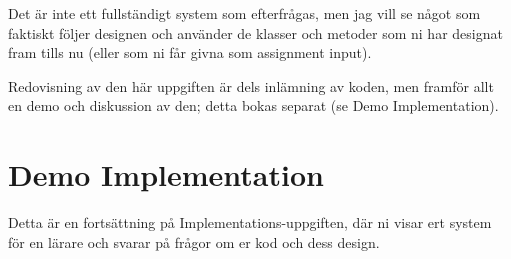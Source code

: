 \documentclass[8pt,oneside]{memoir}
\begin{document}
Det är inte ett fullständigt system som efterfrågas, men jag vill se något som faktiskt följer designen och använder de klasser och metoder som ni har designat fram tills nu (eller som ni får givna som assignment input).

Redovisning av den här uppgiften är dels inlämning av koden, men framför allt en demo och diskussion av den; detta bokas separat (se Demo Implementation).
\chapter{Demo Implementation}
\label{sec:org488645f}
Detta är en fortsättning på Implementations-uppgiften, där ni visar ert system för en lärare och svarar på frågor om er kod och dess design.
\end{document}
